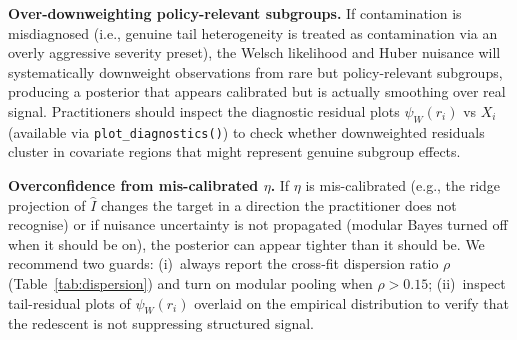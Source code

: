 \textbf{Over-downweighting policy-relevant subgroups.}
If contamination is misdiagnosed (i.e., genuine tail heterogeneity
is treated as contamination via an overly aggressive severity
preset), the Welsch likelihood and Huber nuisance will
systematically downweight observations from rare but
policy-relevant subgroups, producing a posterior that appears
calibrated but is actually smoothing over real signal. Practitioners
should inspect the diagnostic residual plots
$\psi_W(r_i)$ vs $X_i$ (available via \texttt{plot\_diagnostics()})
to check whether downweighted residuals cluster in covariate
regions that might represent genuine subgroup effects.

\textbf{Overconfidence from mis-calibrated $\eta$.}
If $\eta$ is mis-calibrated (e.g., the ridge projection of
$\widehat{I}$ changes the target in a direction the practitioner
does not recognise) or if nuisance uncertainty is not propagated
(modular Bayes turned off when it should be on), the posterior
can appear tighter than it should be. We recommend two guards:
(i)~always report the cross-fit dispersion ratio $\rho$
(Table~\ref{tab:dispersion}) and turn on modular pooling when
$\rho > 0.15$; (ii)~inspect tail-residual plots of
$\psi_W(r_i)$ overlaid on the empirical distribution to verify
that the redescent is not suppressing structured signal.

